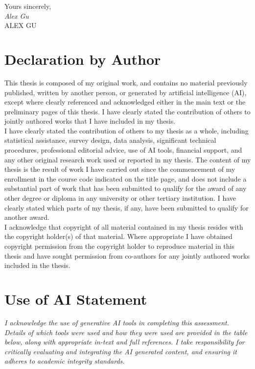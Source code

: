 \documentclass[12pt,openany,a4paper]{book}
\begin{document}
\begin{flushright}
	Yours sincerely,\\
	\medskip
	\emph{Alex Gu}\\
	\medskip
	ALEX GU
\end{flushright}

\chapter{Declaration by Author}

This thesis is composed of my original work, and contains no material previously published, written by another person, or generated by artificial intelligence (AI), except where clearly referenced and acknowledged either in the main text or the preliminary pages of this thesis. I have clearly stated the contribution of others to jointly authored works that I have included in my thesis.\\

I have clearly stated the contribution of others to my thesis as a whole, including statistical assistance, survey design, data analysis, significant technical procedures, professional editorial advice, use of AI tools, financial support, and any other original research work used or reported in my thesis. The content of my thesis is the result of work I have carried out since the commencement of my enrollment in the course code indicated on the title page, and does not include a substantial part of work that has been submitted to qualify for the award of any other degree or diploma in any university or other tertiary institution. I have clearly stated which parts of my thesis, if any, have been submitted to qualify for another award.\\

I acknowledge that copyright of all material contained in my thesis resides with the copyright holder(s) of that material. Where appropriate I have obtained copyright permission from the copyright holder to reproduce material in this thesis and have sought permission from co-authors for any jointly authored works included in the thesis.

\chapter{Use of AI Statement}

\emph{I acknowledge the use of generative AI tools in completing this
assessment. Details of which tools were used and how they were used are
provided in the table below, along with appropriate in-text and full
references. I take responsibility for critically evaluating and
integrating the AI generated content, and ensuring it adheres to
academic integrity standards.}
\end{document}
